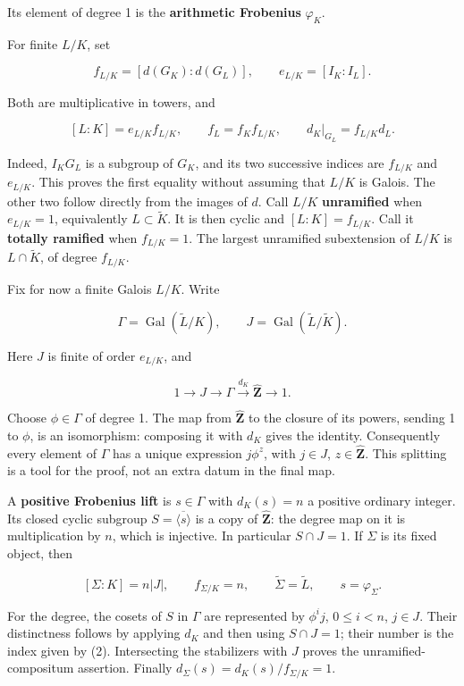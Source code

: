 \documentclass[11pt,a4paper]{article}
\begin{document}
Its element of degree 1 is the \textbf{arithmetic Frobenius}
\(\varphi_K\).

For finite \(L/K\), set

\[
f_{L/K}=[d(G_K):d(G_L)],\qquad
e_{L/K}=[I_K:I_L].
\]

Both are multiplicative in towers, and

\[
[L:K]=e_{L/K}f_{L/K},\qquad
f_L=f_Kf_{L/K},\qquad
d_K|_{G_L}=f_{L/K}d_L.
\tag{1}
\]

Indeed, \(I_KG_L\) is a subgroup of \(G_K\), and its two successive
indices are \(f_{L/K}\) and \(e_{L/K}\). This proves the first equality
without assuming that \(L/K\) is Galois. The other two follow directly
from the images of \(d\). Call \(L/K\) \textbf{unramified} when
\(e_{L/K}=1\), equivalently \(L\subset\widetilde K\). It is then cyclic
and \([L:K]=f_{L/K}\). Call it \textbf{totally ramified} when
\(f_{L/K}=1\). The largest unramified subextension of \(L/K\) is
\(L\cap\widetilde K\), of degree \(f_{L/K}\).

Fix for now a finite Galois \(L/K\). Write

\[
\Gamma=\operatorname{Gal}(\widetilde L/K),\qquad
J=\operatorname{Gal}(\widetilde L/\widetilde K).
\]

Here \(J\) is finite of order \(e_{L/K}\), and

\[
1\longrightarrow J\longrightarrow\Gamma
\xrightarrow{d_K}\widehat{\mathbf Z}\longrightarrow1.
\tag{2}
\]

Choose \(\phi\in\Gamma\) of degree 1. The map from
\(\widehat{\mathbf Z}\) to the closure of its powers, sending 1 to
\(\phi\), is an isomorphism: composing it with \(d_K\) gives the
identity. Consequently every element of \(\Gamma\) has a unique
expression \(j\phi^z\), with \(j\in J\), \(z\in\widehat{\mathbf Z}\).
This splitting is a tool for the proof, not an extra datum in the final
map.

A \textbf{positive Frobenius lift} is \(s\in\Gamma\) with \(d_K(s)=n\) a
positive ordinary integer. Its closed cyclic subgroup
\(S=\overline{\langle s\rangle}\) is a copy of \(\widehat{\mathbf Z}\):
the degree map on it is multiplication by \(n\), which is injective. In
particular \(S\cap J=1\). If \(\Sigma\) is its fixed object, then

\[
[\Sigma:K]=n|J|,\qquad f_{\Sigma/K}=n,
\qquad\widetilde\Sigma=\widetilde L,
\qquad s=\varphi_\Sigma.
\tag{3}
\]

For the degree, the cosets of \(S\) in \(\Gamma\) are represented by
\(\phi^i j\), \(0\leq i<n\), \(j\in J\). Their distinctness follows by
applying \(d_K\) and then using \(S\cap J=1\); their number is the index
given by (2). Intersecting the stabilizers with \(J\) proves the
unramified-compositum assertion. Finally
\(d_\Sigma(s)=d_K(s)/f_{\Sigma/K}=1\).
\end{document}
